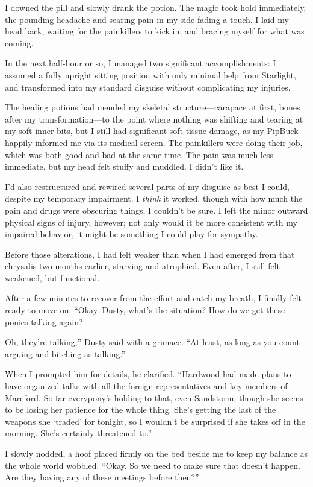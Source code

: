I downed the pill and slowly drank the potion. The magic took hold immediately, the pounding headache and searing pain in my side fading a touch. I laid my head back, waiting for the painkillers to kick in, and bracing myself for what was coming.

{\br}%
In the next half-hour or so, I managed two significant accomplishments: I assumed a fully upright sitting position with only minimal help from Starlight, and transformed into my standard disguise without complicating my injuries.

The healing potions had mended my skeletal structure—carapace at first, bones after my transformation—to the point where nothing was shifting and tearing at my soft inner bits, but I still had significant soft tissue damage, as my PipBuck happily informed me via its medical screen. The painkillers were doing their job, which was both good and bad at the same time. The pain was much less immediate, but my head felt stuffy and muddled. I didn’t like it.

I’d also restructured and rewired several parts of my disguise as best I could, despite my temporary impairment. I \textit{think} it worked, though with how much the pain and drugs were obscuring things, I couldn’t be sure. I left the minor outward physical signs of injury, however; not only would it be more consistent with my impaired behavior, it might be something I could play for sympathy.

Before those alterations, I had felt weaker than when I had emerged from that chrysalis two months earlier, starving and atrophied. Even after, I still felt weakened, but functional.

After a few minutes to recover from the effort and catch my breath, I finally felt ready to move on. “Okay. Dusty, what’s the situation? How do we get these ponies talking again?

\leavevmode{}Oh, they’re talking,” Dusty said with a grimace. “At least, as long as you count arguing and bitching as talking.”

When I prompted him for details, he clarified. “Hardwood had made plans to have organized talks with all the foreign representatives and key members of Mareford. So far everypony’s holding to that, even Sandstorm, though she seems to be losing her patience for the whole thing. She’s getting the last of the weapons she ‘traded’ for tonight, so I wouldn’t be surprised if she takes off in the morning. She’s certainly threatened to.”

I slowly nodded, a hoof placed firmly on the bed beside me to keep my balance as the whole world wobbled. “Okay. So we need to make sure that doesn’t happen. Are they having any of these meetings before then?”

